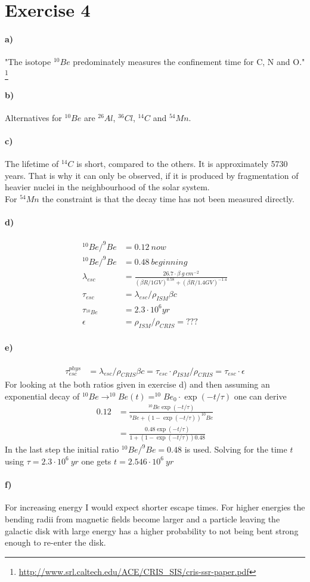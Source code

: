 \documentclass[10pt,a4paper]{article}
\begin{document}
\section*{Exercise 4}
\paragraph{a)}
"The isotope $^{10}Be$ predominately measures the confinement time for C, N and O." \footnote{\url{http://www.srl.caltech.edu/ACE/CRIS_SIS/cris-ssr-paper.pdf}}
\paragraph{b)}
Alternatives for $^{10}Be$ are $^{26}Al$, $^{36}Cl$, $^{14}C$ and $^{54}Mn$.
\paragraph{c)}
The lifetime of $^{14}C$ is short, compared to the others.
It is approximately 5730 years. That is why it can only be observed, if it is produced by fragmentation of heavier nuclei in the neighbourhood of the solar system.\\
For $^{54}Mn$ the constraint is that the decay time has not been measured directly.
\paragraph{d)}
\begin{align*}
^{10}Be/^{9}Be &= 0.12\ now\\
^{10}Be/^{9}Be &= 0.48\ beginning\\
\lambda_{esc} &= \frac{26.7\cdot \beta \ g\ cm^{-2}}{(\beta R / 1GV)^{0.58}+(\beta R / 1.4GV)^{-1.4}}\\
\tau_{esc} &= \lambda_{esc} / \rho_{ISM} \beta c \\
\tau_{^{10}Be} &= 2.3 \cdot 10^6 yr\\
\epsilon &= \rho_{ISM} / \rho_{CRIS} = ???
\end{align*}
\paragraph{e)}
\begin{align*}
\tau_{esc}^{phys} &= \lambda_{esc}/\rho_{CRIS} \beta c = \tau_{esc} \cdot \rho_{ISM} / \rho_{CRIS} = \tau_{esc} \cdot \epsilon
\end{align*}
For looking at the both ratios given in exercise d) and then assuming an exponential decay of $^{10}Be \rightarrow ^{10}Be(t) = ^{10}Be_0 \cdot \exp(-t/\tau)$ one can derive
\begin{align*}
0.12 &= \frac{^{10}Be \exp(-t/\tau)}{^{9}Be + (1 - \exp(-t/\tau)) ^{10}Be} \\
&= \frac{0.48 \exp(-t/\tau)}{1 + (1 - \exp(-t/\tau)) 0.48}
\end{align*}
In the last step the initial ratio $^{10}Be/^{9}Be=0.48$ is used. 
Solving for the time $t$ using $\tau=2.3 \cdot 10^6\ yr$ one gets $t=2.546 \cdot 10^6\ yr$
\paragraph{f)}
For increasing energy I would expect shorter escape times. For higher energies the bending radii from magnetic fields become larger and a particle leaving the galactic disk with large energy has a higher probability to not being bent strong enough to re-enter the disk.
\end{document}
